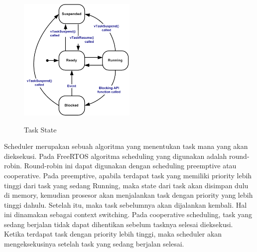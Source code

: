 \documentclass[a4paper,12pt]{article}
\begin{document}
\begin{figure}[H]
\centering
\includegraphics[width=0.5\textwidth]{taskstate.png}\\
\caption{Task State}
\end{figure}

Scheduler merupakan sebuah algoritma yang menentukan task mana yang akan dieksekusi. Pada FreeRTOS algoritma scheduling yang digunakan adalah round-robin. Round-robin ini dapat digunakan dengan scheduling preemptive atau cooperative. Pada preemptive, apabila terdapat task yang memiliki priority lebih tinggi dari task yang sedang Running, maka state dari task akan disimpan dulu di memory, kemudian prosesor akan menjalankan task dengan priority yang lebih tinggi dahulu. Setelah itu, maka task sebelumnya akan dijalankan kembali. Hal ini dinamakan sebagai context switching. Pada cooperative scheduling, task yang sedang berjalan tidak dapat dihentikan sebelum tasknya selesai dieksekusi. Ketika terdapat task dengan priority lebih tinggi, maka scheduler akan mengeksekusinya setelah task yang sedang berjalan selesai.
\end{document}
